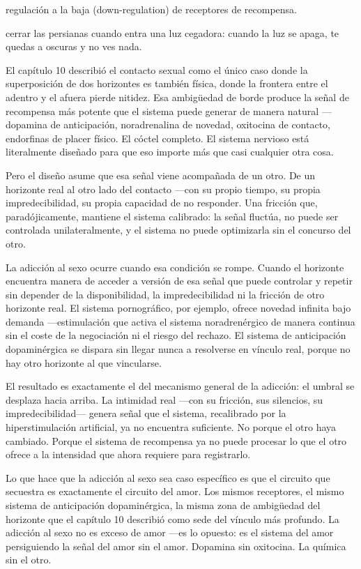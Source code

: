 \begin{fisica}
 regulación a la baja (down-regulation) de receptores de recompensa.

 cerrar las persianas cuando entra una luz cegadora: cuando la luz se apaga, te quedas a oscuras y no ves nada.
\end{fisica}
\noindent El capítulo 10 describió el contacto sexual como el único caso donde la superposición de dos horizontes es también física, donde la frontera entre el adentro y el afuera pierde nitidez. Esa ambigüedad de borde produce la señal de recompensa más potente que el sistema puede generar de manera natural —dopamina de anticipación, noradrenalina de novedad, oxitocina de contacto, endorfinas de placer físico. El cóctel completo. El sistema nervioso está literalmente diseñado para que eso importe más que casi cualquier otra cosa.

Pero el diseño asume que esa señal viene acompañada de un otro. De un horizonte real al otro lado del contacto —con su propio tiempo, su propia impredecibilidad, su propia capacidad de no responder. Una fricción que, paradójicamente, mantiene el sistema calibrado: la señal fluctúa, no puede ser controlada unilateralmente, y el sistema no puede optimizarla sin el concurso del otro.

La adicción al sexo ocurre cuando esa condición se rompe. Cuando el horizonte encuentra manera de acceder a versión de esa señal que puede controlar y repetir sin depender de la disponibilidad, la impredecibilidad ni la fricción de otro horizonte real. El sistema pornográfico, por ejemplo, ofrece novedad infinita bajo demanda —estimulación que activa el sistema noradrenérgico de manera continua sin el coste de la negociación ni el riesgo del rechazo. El sistema de anticipación dopaminérgica se dispara sin llegar nunca a resolverse en vínculo real, porque no hay otro horizonte al que vincularse.

El resultado es exactamente el del mecanismo general de la adicción: el umbral se desplaza hacia arriba. La intimidad real —con su fricción, sus silencios, su impredecibilidad— genera señal que el sistema, recalibrado por la hiperstimulación artificial, ya no encuentra suficiente. No porque el otro haya cambiado. Porque el sistema de recompensa ya no puede procesar lo que el otro ofrece a la intensidad que ahora requiere para registrarlo.

Lo que hace que la adicción al sexo sea caso específico es que el circuito que secuestra es exactamente el circuito del amor. Los mismos receptores, el mismo sistema de anticipación dopaminérgica, la misma zona de ambigüedad del horizonte que el capítulo 10 describió como sede del vínculo más profundo. La adicción al sexo no es exceso de amor —es lo opuesto: es el sistema del amor persiguiendo la señal del amor sin el amor. Dopamina sin oxitocina. La química sin el otro.


